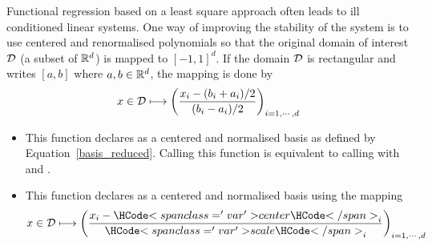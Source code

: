 Functional regression based on a least square approach often leads to ill
conditioned linear systems. One way of improving the stability of the system is to
use centered and renormalised polynomials so that the original domain of interest
${\mathcal D}$ (a subset of ${\mathbb R}^d$) is mapped to $[-1,1]^d$. If the domain ${\mathcal D}$ is
rectangular and writes $[a, b]$ where $a,b \in {\mathbb R}^d$, the mapping is done by 
\begin{equation}
  \label{basis_reduced}
  x \in {\mathcal D} \longmapsto \left(\frac{x_i - (b_i+a_i)/2}{(b_i - a_i)/2}
  \right)_{i=1,\cdots,d}
\end{equation}
\begin{itemize}
\item {}
  \sshortdescribe This function declares  as a centered and normalised basis
  as defined by Equation~\ref{basis_reduced}. Calling this function is equivalent to
  calling  with  and
  .
\item {}
  \sshortdescribe This function declares  as a centered and normalised basis
  using the mapping
  \begin{equation*}
    x \in \cD \longmapsto \left(\frac{x_i - \var{center}_i }{\var{scale}_i}
    \right)_{i=1,\cdots,d}
  \end{equation*}
\end{itemize}



